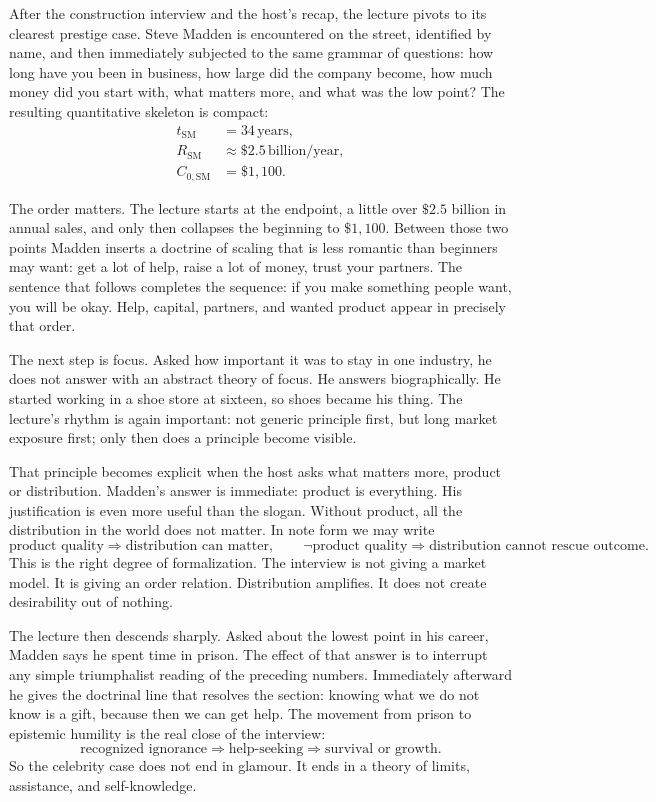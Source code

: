 After the construction interview and the host's recap, the lecture pivots to its clearest prestige case. Steve Madden is encountered on the street, identified by name, and then immediately subjected to the same grammar of questions: how long have you been in business, how large did the company become, how much money did you start with, what matters more, and what was the low point? The resulting quantitative skeleton is compact:
\begin{align}
t_{\text{SM}} &= 34\,\text{years},\\
R_{\text{SM}} &\approx \$2.5\,\text{billion/year},\\
C_{0,\text{SM}} &= \$1{,}100.
\end{align}

The order matters. The lecture starts at the endpoint, a little over \(\$2.5\) billion in annual sales, and only then collapses the beginning to \(\$1{,}100\). Between those two points Madden inserts a doctrine of scaling that is less romantic than beginners may want: get a lot of help, raise a lot of money, trust your partners. The sentence that follows completes the sequence: if you make something people want, you will be okay. Help, capital, partners, and wanted product appear in precisely that order.

The next step is focus. Asked how important it was to stay in one industry, he does not answer with an abstract theory of focus. He answers biographically. He started working in a shoe store at sixteen, so shoes became his thing. The lecture's rhythm is again important: not generic principle first, but long market exposure first; only then does a principle become visible.

That principle becomes explicit when the host asks what matters more, product or distribution. Madden's answer is immediate: product is everything. His justification is even more useful than the slogan. Without product, all the distribution in the world does not matter. In note form we may write
\begin{equation}
\text{product quality} \Rightarrow \text{distribution can matter},
\qquad
\neg \text{product quality} \Rightarrow \text{distribution cannot rescue outcome}.
\end{equation}
This is the right degree of formalization. The interview is not giving a market model. It is giving an order relation. Distribution amplifies. It does not create desirability out of nothing.

The lecture then descends sharply. Asked about the lowest point in his career, Madden says he spent time in prison. The effect of that answer is to interrupt any simple triumphalist reading of the preceding numbers. Immediately afterward he gives the doctrinal line that resolves the section: knowing what we do not know is a gift, because then we can get help. The movement from prison to epistemic humility is the real close of the interview:
\begin{equation}
\text{recognized ignorance} \Rightarrow \text{help-seeking} \Rightarrow \text{survival or growth}.
\end{equation}
So the celebrity case does not end in glamour. It ends in a theory of limits, assistance, and self-knowledge.

